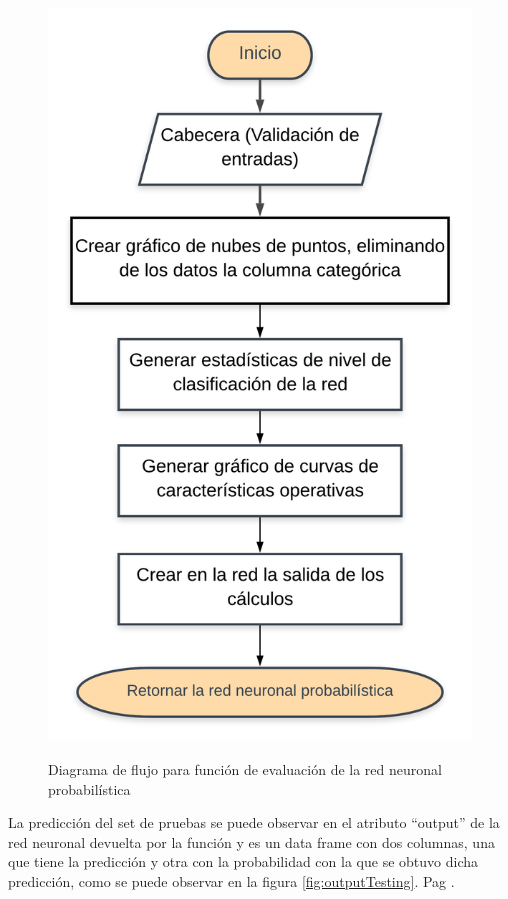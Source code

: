 \begin{figure}[h]
	\caption{Diagrama de flujo para función de evaluación de la red neuronal probabilística}
	\centering
	\includegraphics[scale=0.5]{evaluate.png}
	\label{fig:evaluate}
\end{figure}

	La predicción del set de pruebas se puede observar en el atributo “output” de la red neuronal devuelta por la función y es un data frame con dos columnas, una que tiene la predicción y otra con la probabilidad con la que se obtuvo dicha predicción, como se puede observar en la figura \ref{fig:outputTesting}. Pag \pageref{fig:outputTesting}.\\
	
